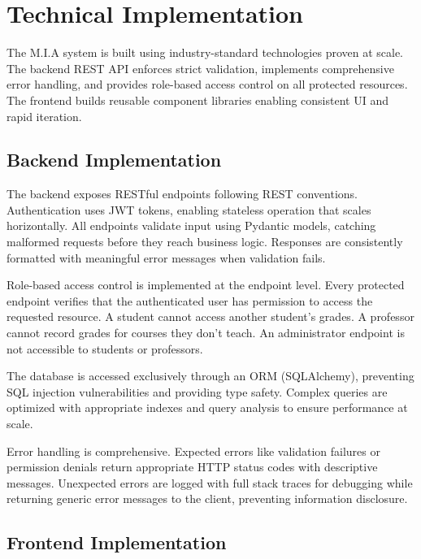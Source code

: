 \documentclass[12pt,a4paper]{report}
\begin{document}
\chapter{Technical Implementation}

The M.I.A system is built using industry-standard technologies proven at scale. The backend REST API enforces strict validation, implements comprehensive error handling, and provides role-based access control on all protected resources. The frontend builds reusable component libraries enabling consistent UI and rapid iteration.

\section{Backend Implementation}

The backend exposes RESTful endpoints following REST conventions. Authentication uses JWT tokens, enabling stateless operation that scales horizontally. All endpoints validate input using Pydantic models, catching malformed requests before they reach business logic. Responses are consistently formatted with meaningful error messages when validation fails.

Role-based access control is implemented at the endpoint level. Every protected endpoint verifies that the authenticated user has permission to access the requested resource. A student cannot access another student's grades. A professor cannot record grades for courses they don't teach. An administrator endpoint is not accessible to students or professors.

The database is accessed exclusively through an ORM (SQLAlchemy), preventing SQL injection vulnerabilities and providing type safety. Complex queries are optimized with appropriate indexes and query analysis to ensure performance at scale.

Error handling is comprehensive. Expected errors like validation failures or permission denials return appropriate HTTP status codes with descriptive messages. Unexpected errors are logged with full stack traces for debugging while returning generic error messages to the client, preventing information disclosure.

\section{Frontend Implementation}
\end{document}
